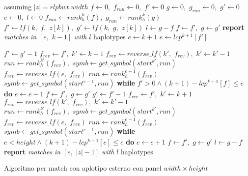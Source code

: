 \documentclass[a4paper,12pt, oneside]{book}
\begin{document}
\begin{algorithm}
  \footnotesize
  \begin{algorithmic}[1]
    \Comment assuming $|z|=rlpbwt.width$
    \State $f\gets 0,\,\,f_{run}\gets 0,\,\,f'\gets 0$
    \State $g\gets 0,\,\,g_{run}\gets 0,\,\,g'\gets 0$
    \State $e\gets 0,\,\,l\gets 0$
    \For {\textit{every} $k\in\left[0,\,\, |z|\right)$}
    \State $f_{run}\gets rank_h^k(f),\,\,g_{run}\gets rank_h^k(g)$
    \State $f'\gets lf(k,\,\, f,\,\, z[k]),\,\,g'\gets lf(k,\,\, g,\,\, z[k])$
    \State $l\gets g-f$
    \State $f\gets f',\,\,g\gets g'$
    \Else
    \State \textbf{report} \textit{matches in} $[e,\,\, k-1]$ \textit{with} $l$
    haplotypes   
    \EndIf
    \State $e\gets k+1$
    \Else
    \State $e\gets lcp^{k+1}[f']$
    \EndIf
    
    \State $f'\gets g'-1$
    \State $f_{rev}\gets f',\,\,k'\gets k+1$
    \State $f_{rev}\gets reverse\_lf(k', \,\,f_{rev}),\,\,k'\gets k'-1$
    \EndWhile
    \State $run\gets rank_h^{k'}(f_{rev}),\,\,symb\gets get\_symbol(start^{k'},
    run)$ 
    \State $f_{rev}\gets reverse\_lf(e, \,\,f_{rev})$
    \State $run\gets rank_h^{e-1}(f_{rev})$
    \State $symb\gets get\_symbol(start^{e-1}, run)$
    \EndWhile
    \EndIf
    \State \textbf{while} $f'>0\land (k+1)-lcp^{k+1}[f]\leq e$ \textbf{do}
    $e\gets e-1$ 
    \State $f\gets f',\,\,g\gets g'$
    \Else
    \State $g'\gets f'-1$
    \State $f_{rev}\gets f',\,\,k'\gets k+1$
    \State $f_{rev}\gets reverse\_lf(k', \,\,f_{rev}),\,\,k'\gets k'-1$
    \EndWhile
    \State $run\gets rank_h^{k'}(f_{rev}),\,\,symb\gets get\_symbol(start^{k'},
    run)$ 
    \State $f_{rev}\gets reverse\_lf(e, \,\,f_{rev})$
    \State $run\gets rank_h^{e-1}(f_{rev})$
    \State $symb\gets get\_symbol(start^{e-1}, run)$
    \EndWhile
    \EndIf
    \State \textbf{while} $e<height\land (k+1)-lcp^{k+1}[e]\leq e$ \textbf{do}
    $e\gets e+1$  
    \State $f\gets f',\,\,g\gets g'$
    \EndIf
    \EndIf
    \EndFor
    \State $l\gets g-f$
    \State \textbf{report} \textit{matches in} $[e,\,\, |z|-1]$ \textit{with} $l$
    haplotypes   
    \EndIf
    \EndFunction
  \end{algorithmic}
  \caption{Algoritmo per match con aplotipo esterno con panel $width\times
  height$} 
\end{algorithm}
\end{document}
